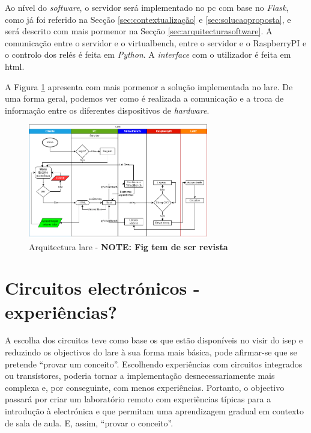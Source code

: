 Ao nível do \textit{software}, o servidor será implementado no \acrshort{pc} com base no \textit{Flask}, como já foi referido na Secção \ref{sec:contextualização} e \ref{sec:solucaoproposta}, e será descrito com mais pormenor na Secção \ref{sec:arquitecturasoftware}. A comunicação entre o servidor e o \acrshort{virtualbench}, entre o servidor e o \gls{RaspberryPI} e o controlo dos relés é feita em \textit{Python}. A \textit{interface} com o utilizador é feita em \acrshort{html}.

A Figura {\ref{fig:arquitecturalore}} apresenta com mais pormenor a solução implementada no \acrshort{lare}. De uma forma geral, podemos ver como é realizada a comunicação e a troca de informação entre os diferentes dispositivos de \textit{hardware}.

\begin{figure}[hbtp]
    \centering
    \includegraphics[width=0.7\textwidth]{figures/Diagrama_SOFTWARE.drawio.png}
    \caption{Arquitectura \acrshort{lare} - \textbf{NOTE: Fig tem de ser revista}}
    \label{fig:arquitecturalore}
\end{figure}

\section{Circuitos electrónicos - experiências?}
\label{sec:circuitos}
A escolha dos circuitos teve como base os que estão disponíveis no \acrshort{visir} do \acrshort{isep} e reduzindo os objectivos do \acrshort{lare} à sua forma mais básica, pode afirmar-se que se pretende ``provar um conceito''. Escolhendo experiências com circuitos integrados ou transístores, poderia tornar a implementação desnecessariamente mais complexa e, por conseguinte, com menos experiências. Portanto, o objectivo passará por criar um \acrshort{laboratório remoto} com experiências típicas para a introdução à electrónica e que permitam uma aprendizagem gradual em contexto de sala de aula. E, assim, ``provar o conceito''.


